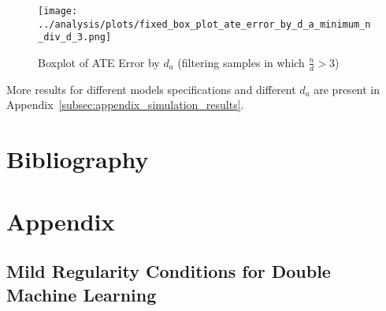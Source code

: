 \documentclass{article}
\numberwithin{equation}{section}
\begin{document}
\begin{figure}[H]
    \centering
    \texttt{[image: ../analysis/plots/fixed\_box\_plot\_ate\_error\_by\_d\_a\_minimum\_n\_div\_d\_3.png]}
    \caption{Boxplot of ATE Error by $d_a$ (filtering samples in which $\frac{n}{d} > 3$)}
\end{figure}

More results for different models specifications and different $d_a$ are present in Appendix~\ref{subsec:appendix_simulation_results}.

\newpage

\section{Bibliography}



\newpage

\section{Appendix}

\subsection{Mild Regularity Conditions for Double Machine Learning}
\label{subsec:appendix_mild_regularity_conditions_for_dml}
\end{document}
